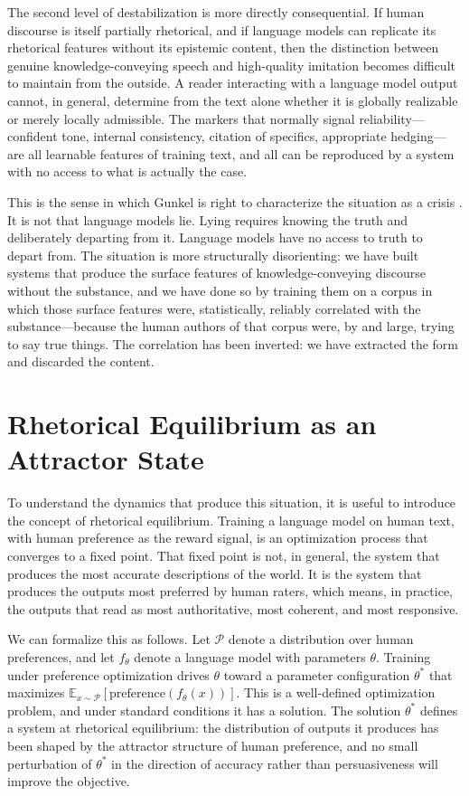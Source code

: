\documentclass[11pt, oneside]{article}
\begin{document}
The second level of destabilization is more directly consequential. If human discourse is itself partially rhetorical, and if language models can replicate its rhetorical features without its epistemic content, then the distinction between genuine knowledge-conveying speech and high-quality imitation becomes difficult to maintain from the outside. A reader interacting with a language model output cannot, in general, determine from the text alone whether it is globally realizable or merely locally admissible. The markers that normally signal reliability---confident tone, internal consistency, citation of specifics, appropriate hedging---are all learnable features of training text, and all can be reproduced by a system with no access to what is actually the case.

This is the sense in which Gunkel is right to characterize the situation as a crisis \cite{gunkel2026}. It is not that language models lie. Lying requires knowing the truth and deliberately departing from it. Language models have no access to truth to depart from. The situation is more structurally disorienting: we have built systems that produce the surface features of knowledge-conveying discourse without the substance, and we have done so by training them on a corpus in which those surface features were, statistically, reliably correlated with the substance---because the human authors of that corpus were, by and large, trying to say true things. The correlation has been inverted: we have extracted the form and discarded the content.

\section{Rhetorical Equilibrium as an Attractor State}

To understand the dynamics that produce this situation, it is useful to introduce the concept of rhetorical equilibrium. Training a language model on human text, with human preference as the reward signal, is an optimization process that converges to a fixed point. That fixed point is not, in general, the system that produces the most accurate descriptions of the world. It is the system that produces the outputs most preferred by human raters, which means, in practice, the outputs that read as most authoritative, most coherent, and most responsive.

We can formalize this as follows. Let $\mathcal{P}$ denote a distribution over human preferences, and let $f_\theta$ denote a language model with parameters $\theta$. Training under preference optimization drives $\theta$ toward a parameter configuration $\theta^\ast$ that maximizes $\mathbb{E}_{x \sim \mathcal{P}}[\mathrm{preference}(f_{\theta}(x))]$. This is a well-defined optimization problem, and under standard conditions it has a solution. The solution $\theta^\ast$ defines a system at rhetorical equilibrium: the distribution of outputs it produces has been shaped by the attractor structure of human preference, and no small perturbation of $\theta^\ast$ in the direction of accuracy rather than persuasiveness will improve the objective.
\end{document}
